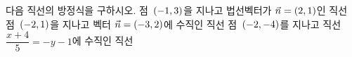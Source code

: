 다음 직선의 방정식을 구하시오.
 점~$(-1{,}\mkern3mu\mathopen{}3)$을 지나고 법선벡터가 $\vec{n}=(2{,}\mkern3mu\mathopen{}1)$인 직선
 점~$(-2{,}\mkern3mu\mathopen{}1)$을 지나고 벡터 $\vec{n}=(-3{,}\mkern3mu\mathopen{}2)$에 수직인 직선
 점~$(-2{,}\mkern3mu\mathopen{}-4)$를 지나고 직선 $\dfrac{x+4}{5}=-y-1$에 수직인 직선
